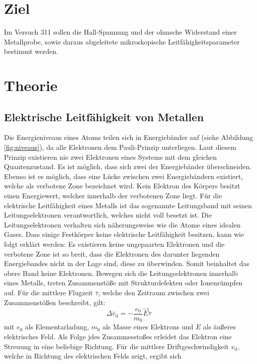 \section{Ziel}
\label{sec:Ziel}
Im Versuch 311 sollen die Hall-Spannung und der ohmsche Widerstand einer Metallprobe, sowie daraus abgeleitete mikroskopische Leitfähigkeitsparameter bestimmt werden.

\section{Theorie}
\label{sec:theorie}

\subsection{Elektrische Leitfähigkeit von Metallen}
Die Energieniveaus eines Atoms teilen sich in Energiebänder auf (siehe Abbildung \ref{fig:niveaus}), da alle Elektronen dem Pauli-Prinzip unterliegen. Laut diesem Prinzip existieren nie zwei Elektronen eines Systems mit dem gleichen Quantenzustand.
Es ist möglich, dass sich zwei der Energiebänder überschneiden. Ebenso ist es möglich, dass eine Lücke zwischen zwei Energiebändern existiert, welche als verbotene Zone bezeichnet wird. Kein Elektron des Körpers besitzt einen Energiewert, welcher innerhalb der verbotenen Zone liegt.
Für die elektrische Leitfähigkeit eines Metalls ist das sogenannte Leitungsband  mit seinen Leitungselektronen verantwortlich, welches nicht voll besetzt ist. Die Leitungselektronen verhalten sich näherungsweise wie die Atome eines idealen Gases. Dass einige Festkörper keine elektrische Leitfähigkeit besitzen, kann wie folgt erklärt werden: Es existieren keine ungepaarten Elektronen und die verbotene Zone ist so breit, dass die Elektronen des darunter liegenden Energiebandes nicht in der Lage sind, diese zu überwinden. Somit beinhaltet das obere Band keine Elektronen.
Bewegen sich die Leitungselektronen innerhalb eines Metalls, treten Zusammenstöße mit Strukturdefekten oder Ionenrümpfen auf. Für die mittlere Flugzeit $\overline{\tau}$, welche den Zeitraum zwischen zwei Zusammenstößen beschreibt, gilt:
\begin{equation}
\Delta\overline{v}_\mathrm{d}=-\frac{e_0}{m_0}\vec{E} \overline{\tau}
\end{equation}
mit $e_0$ als Elementarladung, $m_0$ als Masse eines Elektrons und $E$ als äußeres elektrisches Feld. Als Folge jdes Zusammesstoßes erleidet das Elektron eine Streuung in eine beliebige Richtung. Für die mittlere Driftgeschwindigkeit $v_\mathrm{d}$, welche in Richtung des elektrischen Felds zeigt, ergibt sich
